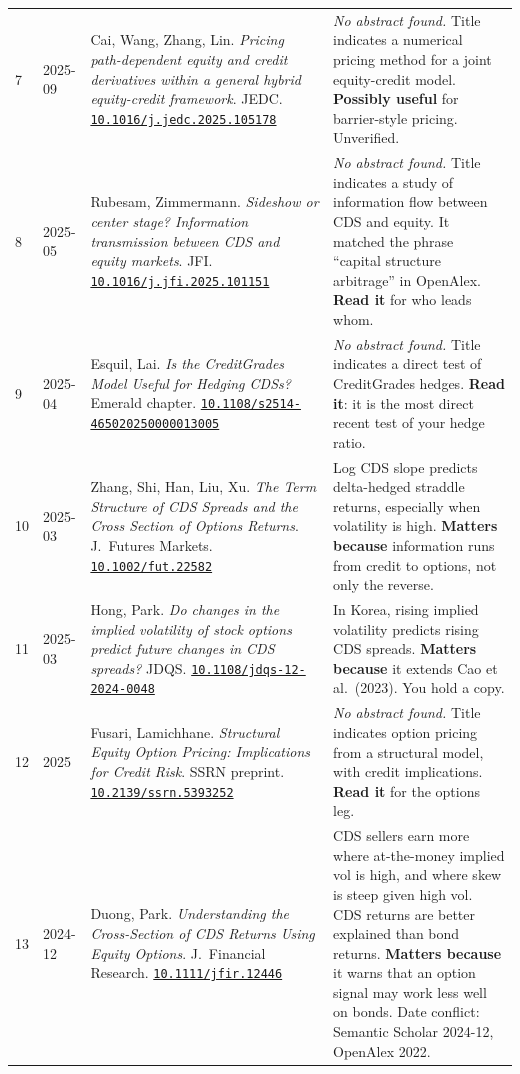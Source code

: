 \documentclass[10pt,a4paper]{article}
\newcommand{\doi}[1]{\href{https://doi.org/#1}{\nolinkurl{#1}}}
\begin{document}
{\begin{longtable}{@{}P{0.5cm}P{1.3cm}P{5.6cm}P{9.2cm}@{}}
7 & 2025-09 & Cai, Wang, Zhang, Lin. \emph{Pricing path-dependent equity and credit derivatives within a general hybrid equity-credit framework}. JEDC. \doi{10.1016/j.jedc.2025.105178} & \emph{No abstract found.} Title indicates a numerical pricing method for a joint equity-credit model. \textbf{Possibly useful} for barrier-style pricing. Unverified. \\
8 & 2025-05 & Rubesam, Zimmermann. \emph{Sideshow or center stage? Information transmission between CDS and equity markets}. JFI. \doi{10.1016/j.jfi.2025.101151} & \emph{No abstract found.} Title indicates a study of information flow between CDS and equity. It matched the phrase ``capital structure arbitrage'' in OpenAlex. \textbf{Read it} for who leads whom. \\
9 & 2025-04 & Esquil, Lai. \emph{Is the CreditGrades Model Useful for Hedging CDSs?} Emerald chapter. \doi{10.1108/s2514-465020250000013005} & \emph{No abstract found.} Title indicates a direct test of CreditGrades hedges. \textbf{Read it}: it is the most direct recent test of your hedge ratio. \\
10 & 2025-03 & Zhang, Shi, Han, Liu, Xu. \emph{The Term Structure of CDS Spreads and the Cross Section of Options Returns}. J.\ Futures Markets. \doi{10.1002/fut.22582} & Log CDS slope predicts delta-hedged straddle returns, especially when volatility is high. \textbf{Matters because} information runs from credit to options, not only the reverse. \\
11 & 2025-03 & Hong, Park. \emph{Do changes in the implied volatility of stock options predict future changes in CDS spreads?} JDQS. \doi{10.1108/jdqs-12-2024-0048} & In Korea, rising implied volatility predicts rising CDS spreads. \textbf{Matters because} it extends Cao et al.\ (2023). You hold a copy. \\
12 & 2025 & Fusari, Lamichhane. \emph{Structural Equity Option Pricing: Implications for Credit Risk}. SSRN preprint. \doi{10.2139/ssrn.5393252} & \emph{No abstract found.} Title indicates option pricing from a structural model, with credit implications. \textbf{Read it} for the options leg. \\
13 & 2024-12 & Duong, Park. \emph{Understanding the Cross-Section of CDS Returns Using Equity Options}. J.\ Financial Research. \doi{10.1111/jfir.12446} & CDS sellers earn more where at-the-money implied vol is high, and where skew is steep given high vol. CDS returns are better explained than bond returns. \textbf{Matters because} it warns that an option signal may work less well on bonds. Date conflict: Semantic Scholar 2024-12, OpenAlex 2022. \\

\end{longtable}}
\end{document}
